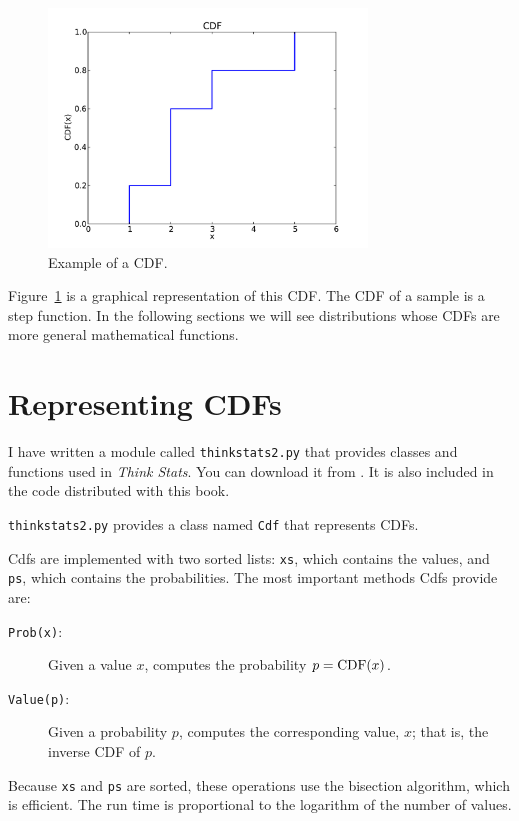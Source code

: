 \documentclass[12pt]{book}
\begin{document}
\begin{figure}
\centerline{\includegraphics[height=2.5in]{figs/example_cdf.pdf}}
\caption{Example of a CDF.}
\label{example_cdf}
\end{figure}

Figure~\ref{example_cdf} is a graphical representation of this CDF.
The CDF of a sample is a step function.  In the following sections we
will see distributions whose CDFs are more general mathematical
functions.


\section{Representing CDFs}

I have written a module called
{\tt thinkstats2.py} that provides classes and functions used in
{\it Think Stats}.  You can download it from \url{}.  It is also
included in the code distributed with this book.

{\tt thinkstats2.py} provides a class named
{\tt Cdf} that represents CDFs.  

Cdfs are implemented with two sorted lists: {\tt xs}, which contains
the values, and {\tt ps}, which contains the probabilities.  The
most important methods Cdfs provide are:

\begin{description}

\item[{\tt Prob(x)}:] Given a value $x$, computes the probability $p = \mathrm{CDF}(x)$.

\item[{\tt Value(p)}:] Given a probability $p$, computes the
corresponding value, $x$; that is, the inverse CDF of $p$.

\end{description}

Because {\tt xs} and {\tt ps} are sorted, these operations use the
bisection algorithm, which is efficient.  The run time is proportional
to the logarithm of the number of values.
\end{document}
